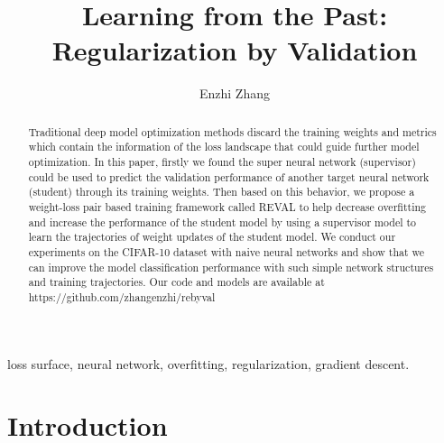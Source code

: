 \documentclass[english]{sobraep}
\title{Learning from the Past: Regularization by Validation\\}
\author{Enzhi Zhang}
\begin{document}
\maketitle

\begin{abstract}
    Traditional deep model optimization methods discard the training weights and metrics which contain the information of the loss landscape that could guide further model optimization. In this paper, firstly we found the super neural network (supervisor) could be used to predict the validation performance of another target neural network (student) through its training weights. Then based on this behavior, we propose a weight-loss pair based training framework called REVAL to help decrease overfitting and increase the performance of the student model by using a supervisor model to learn the trajectories of weight updates of the student model. We conduct our experiments on the CIFAR-10 dataset with naive neural networks and show that we can improve the model classification performance with such simple network structures and training trajectories. Our code and models are available at https://github.com/zhangenzhi/rebyval
\end{abstract}

\begin{keywords}
    loss surface, neural network, overfitting, regularization, gradient descent.
\end{keywords}

\let\thefootnote\relax{}



\section{Introduction}
\end{document}
